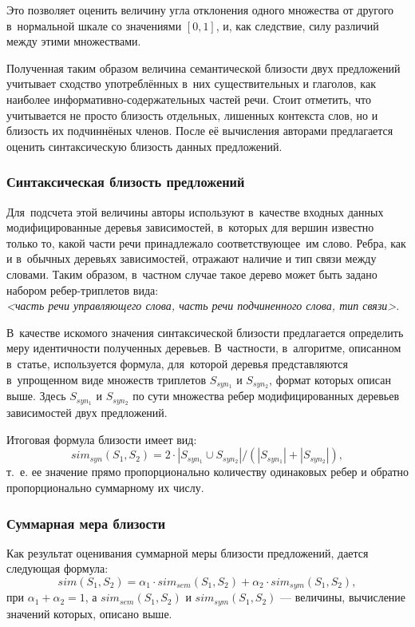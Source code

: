 Это позволяет оценить величину угла отклонения одного множества от другого в~нормальной шкале
со значениями $[0,1]$, и, как следствие,
 силу различий между этими множествами.

Полученная таким образом величина семантической близости двух предложений
учитывает сходство употреблённых в~них существительных и глаголов,
как наиболее информативно-содержательных частей речи. 
Стоит отметить, что учитывается не просто близость
отдельных, лишенных контекста слов, но и близость их подчиннёных членов. 
После её вычисления авторами предлагается оценить
синтаксическую близость данных предложений.

\subsubsection{Синтаксическая близость предложений}
\label{sec:syntactic_similarity}

Для~подсчета этой величины авторы используют в~качестве входных данных
модифицированные деревья зависимостей, в~которых для вершин известно только то, 
какой части речи принадлежало соответствующее~им слово.
Ребра, как и в~обычных деревьях зависимостей, отражают
наличие и тип связи между словами.
Таким образом, в~частном случае такое дерево может быть задано
набором ребер-триплетов вида: \\
\textit{<часть речи управляющего слова, часть речи подчиненного слова, тип связи>}.

В~качестве искомого значения синтаксической близости предлагается определить меру идентичности полученных деревьев. 
В~частности, в~алгоритме, описанном в~статье,
используется формула, для~которой деревья представляются в~упрощенном виде
множеств триплетов $S_{syn_1}$ и $S_{syn_2}$, формат которых описан выше.
Здесь $S_{syn_1}$ и $S_{syn_2}$ по сути множества ребер 
модифицированных деревьев зависимостей двух предложений.

Итоговая формула близости имеет вид: 
$$sim_{syn}(S_1, S_2) = 2 \cdot |S_{syn_1} \cup S_{syn_2}| / (|S_{syn_1}| + |S_{syn_2}|),$$ 
т.~е. ее значение прямо пропорционально количеству одинаковых ребер
и обратно пропорционально суммарному их числу.

\subsubsection{Суммарная мера близости}

Как результат оценивания суммарной меры близости предложений, 
дается следующая формула:
$$sim(S_1, S_2) = \alpha_1 \cdot sim_{sem}(S_1, S_2) + \alpha_2 \cdot sim_{sym}(S_1, S_2),$$
 при $\alpha_1+\alpha_2=1$,
а $sim_{sem}(S_1, S_2)$ и 
$sim_{sym}(S_1, S_2)$ --- величины, вычисление значений которых, описано выше.

